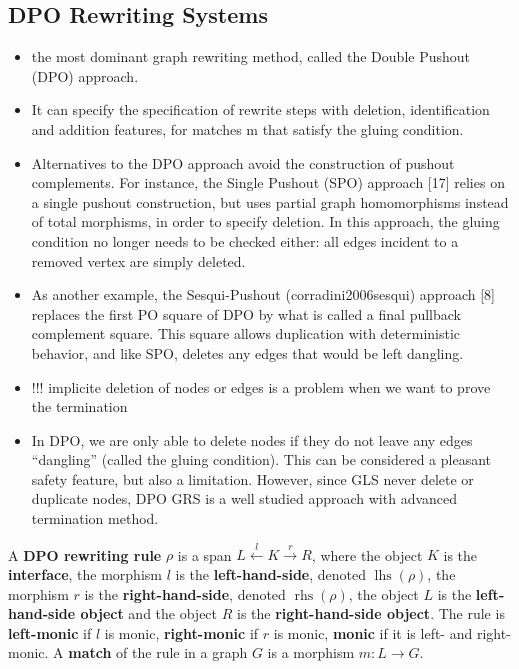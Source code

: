 \documentclass{book}
\begin{document}
    \subsection{DPO Rewriting Systems}

    \begin{itemize}
      \item the most dominant graph rewriting method, called the Double Pushout (DPO) approach.
      \item It can  specify the specification of rewrite steps with deletion, identification and addition features, for matches m that satisfy the gluing condition.
      \item Alternatives to the DPO approach avoid the construction of pushout complements. For instance, the Single Pushout (SPO) approach [17] relies on a single pushout construction, but uses partial graph homomorphisms instead of total morphisms, in order to specify deletion. In this approach, the gluing condition no longer needs to be checked either: all edges incident to a removed vertex are simply deleted.
      \item As another example, the Sesqui-Pushout (corradini2006sesqui) approach [8] replaces the first PO square of DPO by what is called a final pullback complement square. This square allows duplication with deterministic behavior, and like SPO, deletes any edges that would be left dangling.
      \item !!! implicite deletion of nodes or edges is a problem when we want to prove the termination 
      \item In DPO, we are only able to delete nodes if they do not leave any edges “dangling” (called the gluing condition). This can be considered a pleasant safety feature, but also a limitation. However, since GLS never delete or duplicate nodes, DPO GRS is a well studied approach with advanced termination method.
    \end{itemize}

    \begin{definition}
        \label{def:grs:dpo_rule}
      A \textbf{DPO rewriting rule} $\rho$ is a span \( L \overset{l}{\leftarrow} K \overset{r}{\rightarrow} R \), where       
      the object \( K \) is the \textbf{interface}, 
      the morphism \( l \) is the \textbf{left-hand-side}, denoted \( \operatorname{lhs}(\rho) \),
      the morphism \( r \) is the \textbf{right-hand-side}, denoted \( \operatorname{rhs}(\rho) \),
      the object \( L \) is the \textbf{left-hand-side object} and the object \( R \) is the \textbf{right-hand-side object}. The rule is \textbf{left-monic} if \( l \) is monic, \textbf{right-monic} if \( r \) is monic, \textbf{monic} if it is left- and right-monic.
      A \textbf{match} of the rule in a graph \( G \) is a morphism \( m: L \mathop{\rightarrow} G \).   
      \end{definition}
    
\end{document}
